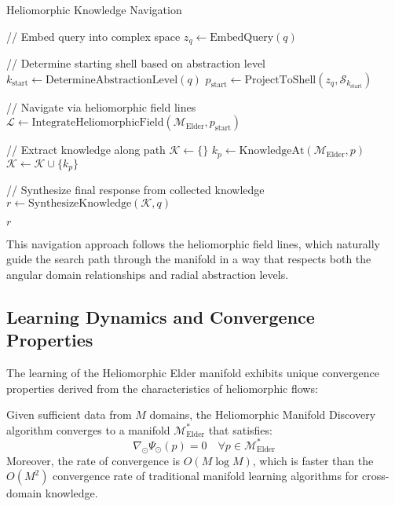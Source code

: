 \begin{algorithm}
\caption{Heliomorphic Knowledge Navigation}
\begin{algorithmic}[1]
    \State // Embed query into complex space
    \State $z_q \gets \text{EmbedQuery}(q)$
    
    \State // Determine starting shell based on abstraction level
    \State $k_{\text{start}} \gets \text{DetermineAbstractionLevel}(q)$
    \State $p_{\text{start}} \gets \text{ProjectToShell}(z_q, \mathcal{S}_{k_{\text{start}}})$
    
    \State // Navigate via heliomorphic field lines
    \State $\mathcal{L} \gets \text{IntegrateHeliomorphicField}(\mathcal{M}_{\text{Elder}}, p_{\text{start}})$
    
    \State // Extract knowledge along path
    \State $\mathcal{K} \gets \{\}$
        \State $k_p \gets \text{KnowledgeAt}(\mathcal{M}_{\text{Elder}}, p)$
        \State $\mathcal{K} \gets \mathcal{K} \cup \{k_p\}$
    \EndFor
    
    \State // Synthesize final response from collected knowledge
    \State $r \gets \text{SynthesizeKnowledge}(\mathcal{K}, q)$
    
    \State \Return $r$
\EndFunction
\end{algorithmic}
\end{algorithm}

This navigation approach follows the heliomorphic field lines, which naturally guide the search path through the manifold in a way that respects both the angular domain relationships and radial abstraction levels.

\subsection{Learning Dynamics and Convergence Properties}

The learning of the Heliomorphic Elder manifold exhibits unique convergence properties derived from the characteristics of heliomorphic flows:

\begin{theorem}
Given sufficient data from $M$ domains, the Heliomorphic Manifold Discovery algorithm converges to a manifold $\mathcal{M}_{\text{Elder}}^*$ that satisfies:
\begin{equation}
\nabla_{\odot} \Psi_{\odot}(p) = 0 \quad \forall p \in \mathcal{M}_{\text{Elder}}^*
\end{equation}
Moreover, the rate of convergence is $O(M \log M)$, which is faster than the $O(M^2)$ convergence rate of traditional manifold learning algorithms for cross-domain knowledge.
\end{theorem}

